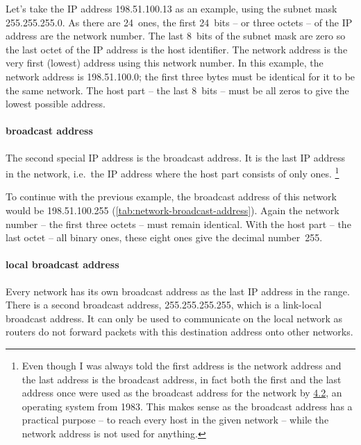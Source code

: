 Let's take the \acs{IP} address 198.51.100.13 as an example, using the subnet mask 255.255.255.0.
As there are 24~ones, the first 24~bits -- or three octets -- of the \acs{IP} address are the network number.
The last 8~bits of the subnet mask are zero so the last octet of the \acs{IP} address is the host identifier.
The network address is the very first (lowest) address using this network number.
In this example, the network address is 198.51.100.0; the first three bytes must be identical for it to be the same network.
The host part -- the last 8~bits -- must be all zeros to give the lowest possible address.


\paragraph{broadcast address}
The second special \acs{IP} address is the broadcast address.
It is the last \acs{IP} address in the network, i.e.~the \acs{IP} address where the host part consists of only ones.%
\footnote{%
   Even though I was always told the first address is the network address and the last address is the broadcast address, in fact both the first and the last address once were used as the broadcast address for the network by \href{https://github.com/schoen/unicast-extensions/blob/master/LOWEST.md}{4.2}, an operating system from 1983.
   This makes sense as the broadcast address has a practical purpose -- to reach every host in the given network -- while the network address is not used for anything.
}

To continue with the previous example, the broadcast address of this network would be 198.51.100.255 (\vref{tab:network-broadcast-address}).
Again the network number -- the first three octets -- must remain identical.
With the host part -- the last octet -- all binary ones, these eight ones give the decimal number~255.

\paragraph{local broadcast address}
Every network has its own broadcast address as the last \acs{IP} address in the range.
There is a second broadcast address, 255.255.255.255, which is a link-local broadcast address.
It can only be used to communicate on the local network as routers do not forward packets with this destination address onto other networks.

